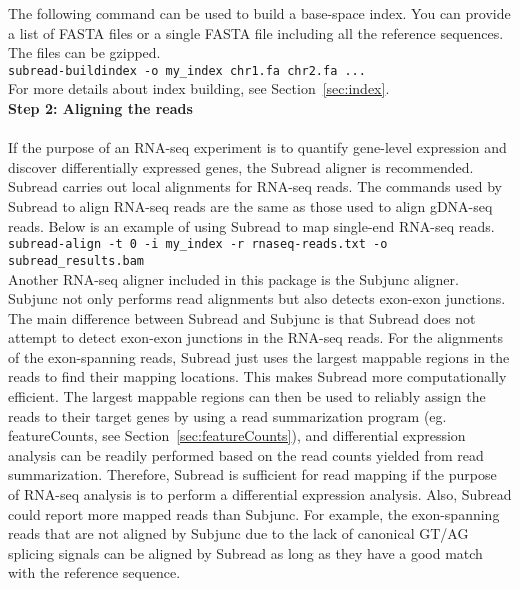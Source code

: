 \documentclass[12pt]{report}
\newcommand{\code}[1]{{\small\texttt{#1}}}
\newcommand{\Subread}{\textsf{Subread}}
\newcommand{\Subjunc}{\textsf{Subjunc}}
\newcommand{\featureCounts}{\textsf{featureCounts}}
\begin{document}
\noindent The following command can be used to build a base-space index.
You can provide a list of FASTA files or a single FASTA file including all the reference sequences.
The files can be gzipped.\\

\code{subread-buildindex -o my\_index chr1.fa chr2.fa ...}\\

\noindent For more details about index building, see Section~\ref{sec:index}.\\

{\noindent\bf Step 2: Aligning the reads}\\

\noindent{{\Subread}}\\

\noindent If the purpose of an RNA-seq experiment is to quantify gene-level expression and discover differentially expressed genes, the {\Subread} aligner is recommended.
{\Subread} carries out local alignments for RNA-seq reads.
The commands used by {\Subread} to align RNA-seq reads are the same as those used to align gDNA-seq reads.
Below is an example of using {\Subread} to map single-end RNA-seq reads.\\

\code{subread-align -t 0 -i my\_index -r rnaseq-reads.txt -o subread\_results.bam}\\

\noindent Another RNA-seq aligner included in this package is the {\Subjunc} aligner.
{\Subjunc} not only performs read alignments but also detects exon-exon junctions.
The main difference between {\Subread} and {\Subjunc} is that {\Subread} does not attempt to detect exon-exon junctions in the RNA-seq reads.
For the alignments of the exon-spanning reads, {\Subread} just uses the largest mappable regions in the reads to find their mapping locations.
This makes {\Subread} more computationally efficient.
The largest mappable regions can then be used to reliably assign the reads to their target genes by using a read summarization program (eg. \featureCounts, see Section~\ref{sec:featureCounts}), and differential expression analysis can be readily performed based on the read counts yielded from read summarization.
Therefore, {\Subread} is sufficient for read mapping if the purpose of RNA-seq analysis is to perform a differential expression analysis. 
Also, {\Subread} could report more mapped reads than {\Subjunc}.
For example, the exon-spanning reads that are not aligned by {\Subjunc} due to the lack of canonical GT/AG splicing signals can be aligned by {\Subread} as long as they have a good match with the reference sequence.\\
\end{document}
